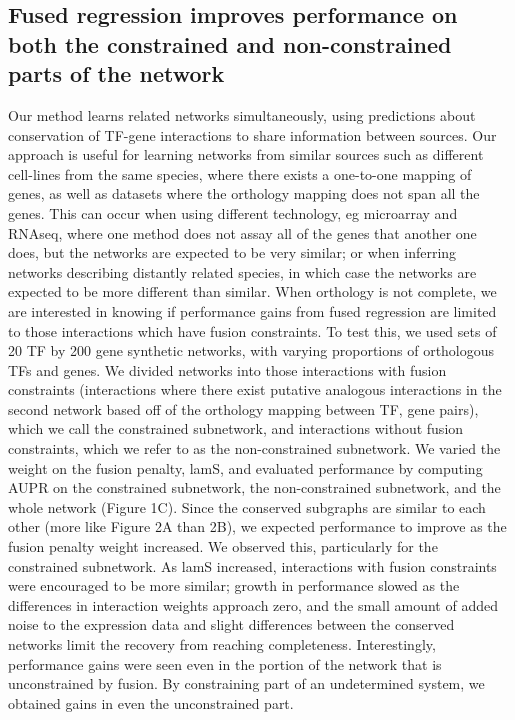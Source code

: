 \documentclass[11pt]{article}
\begin{document}
\subsection{Fused regression improves performance on both the constrained and non-constrained parts of the network}
Our method learns related networks simultaneously, using predictions about conservation of TF-gene interactions to share information between sources. Our approach is useful for learning networks from similar sources such as different cell-lines from the same species, where there exists a one-to-one mapping of genes, as well as datasets where the orthology mapping does not span all the genes. This can occur when using different technology, eg microarray and RNAseq, where one method does not assay all of the genes that another one does, but the networks are expected to be very similar; or when inferring networks describing distantly related species, in which case the networks are expected to be more different than similar. When orthology is not complete, we are interested in knowing if performance gains from fused regression are limited to those interactions which have fusion constraints. To test this, we used sets of 20 TF by 200 gene synthetic networks, with varying proportions of orthologous TFs and genes. We divided networks into those interactions with fusion constraints (interactions where there exist putative analogous interactions in the second network based off of the orthology mapping between TF, gene pairs), which we call the constrained subnetwork, and interactions without fusion constraints, which we refer to as the non-constrained subnetwork. We varied the weight on the fusion penalty, lamS, and evaluated performance by computing AUPR on the constrained subnetwork, the non-constrained subnetwork, and the whole network (Figure 1C). Since the conserved subgraphs are similar to each other (more like Figure 2A than 2B), we expected performance to improve as the fusion penalty weight increased. We observed this, particularly for the constrained subnetwork. As lamS increased, interactions with fusion constraints were encouraged to be more similar; growth in performance slowed as the differences in interaction weights approach zero, and the small amount of added noise to the expression data and slight differences between the conserved networks limit the recovery from reaching completeness. Interestingly, performance gains were seen even in the portion of the network that is unconstrained by fusion. By constraining part of an undetermined system, we obtained gains in even the unconstrained part. 
\end{document}
